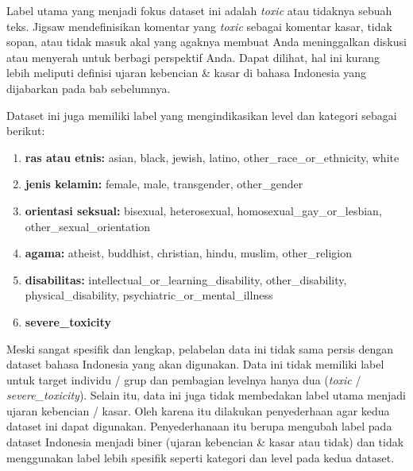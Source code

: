	Label utama yang menjadi fokus dataset ini adalah \textit{toxic} atau tidaknya sebuah teks. Jigsaw mendefinisikan komentar yang \textit{toxic} sebagai komentar kasar, tidak sopan, atau tidak masuk akal yang agaknya membuat Anda meninggalkan diskusi atau menyerah untuk berbagi perspektif Anda. Dapat dilihat, hal ini kurang lebih meliputi definisi ujaran kebencian \& kasar di bahasa Indonesia yang dijabarkan pada bab sebelumnya.

	Dataset ini juga memiliki label yang mengindikasikan level dan kategori sebagai berikut:
	\begin{enumerate}
		\item \textbf{ras atau etnis:} asian, black, jewish, latino, other\_race\_or\_ethnicity, white
		\item  \textbf{jenis kelamin:} female, male, transgender, other\_gender
		\item  \textbf{orientasi seksual:} bisexual, heterosexual, homosexual\_gay\_or\_lesbian, \\
		other\_sexual\_orientation
		\item \textbf{agama:} atheist, buddhist, christian, hindu, muslim, other\_religion
		\item \textbf{disabilitas:} intellectual\_or\_learning\_disability, other\_disability, physical\_disability, psychiatric\_or\_mental\_illness
		\item \textbf{severe\_toxicity}
	\end{enumerate}

	Meski sangat spesifik dan lengkap, pelabelan data ini tidak sama persis dengan dataset bahasa Indonesia yang akan digunakan. Data ini tidak memiliki label untuk target individu / grup dan pembagian levelnya hanya dua (\textit{toxic} / \textit{severe\_toxicity}). Selain itu, data ini juga tidak membedakan label utama menjadi ujaran kebencian / kasar. Oleh karena itu dilakukan penyederhaan agar kedua dataset ini dapat digunakan. Penyederhanaan itu berupa mengubah label pada dataset Indonesia menjadi biner (ujaran kebencian \& kasar atau tidak) dan tidak menggunakan label lebih spesifik seperti kategori dan level pada kedua dataset.

